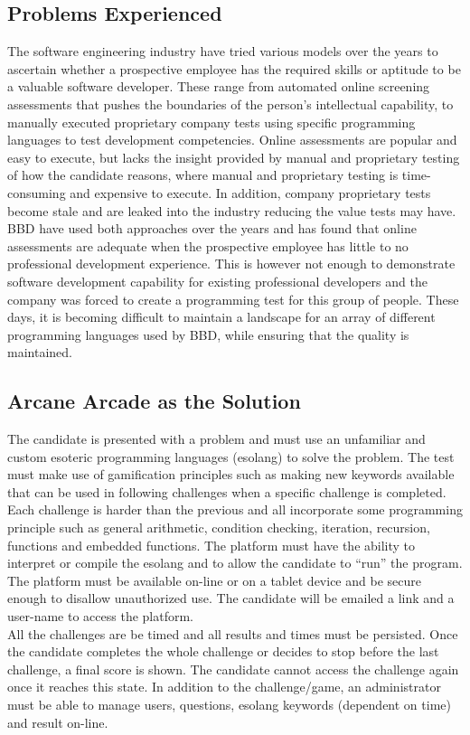 \documentclass[english]{article}
\begin{document}
		\subsection{Problems Experienced}
		The software engineering industry have tried various models over the years to ascertain whether a prospective employee has the required skills or aptitude to be a valuable software developer. These range from automated online screening assessments that pushes the boundaries of the person's intellectual capability, to manually executed proprietary company tests using specific programming languages to test development competencies. Online assessments are popular and easy to execute, but lacks the insight provided by manual and proprietary testing of how the candidate reasons, where manual and proprietary testing is time-consuming and expensive to execute. In addition, company proprietary tests become stale and are leaked into the industry reducing the value tests may have.
		\\[12pt]
		BBD have used both approaches over the years and has found that online assessments are adequate when the prospective employee has little to no professional development experience. This is however not enough to demonstrate software development capability for existing professional developers and the company was forced to create a programming test for this group of people. These days, it is becoming difficult to maintain a landscape for an array of different programming languages used by BBD, while ensuring that the quality is maintained.

		\newpage
		\subsection{Arcane Arcade as the Solution}
		The candidate is presented with a problem and must use an unfamiliar and custom esoteric programming languages (esolang) to solve the problem. The test must make use of gamification principles such as making new keywords available that can be used in following challenges when a specific challenge is completed. 
		\\[12pt]
		Each challenge is harder than the previous and all incorporate some programming principle such as general arithmetic, condition checking, iteration, recursion, functions and embedded functions. The platform must have the ability to interpret or compile the esolang and to allow the candidate to “run” the program. The platform must be available on-line or on a tablet device and be secure enough to disallow unauthorized use. The candidate will be emailed a link and a user-name to access the platform. 
		\\[12pt]
		All the challenges are be timed and all results and times must be persisted. Once the candidate completes the whole challenge or decides to stop before the last challenge, a final score is shown. The candidate cannot access the challenge again once it reaches this state. In addition to the challenge/game, an administrator must be able to manage users, questions, esolang keywords (dependent on time) and result on-line.
		
\end{document}
